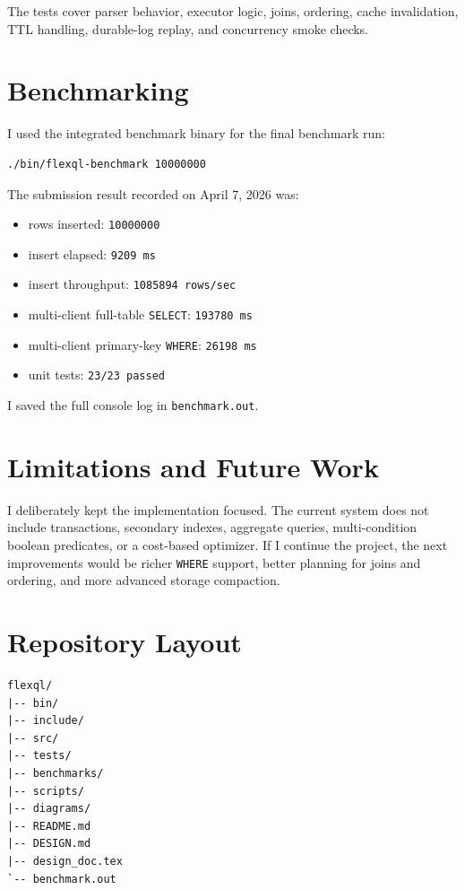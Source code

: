 \documentclass[11pt,a4paper]{article}
\begin{document}
The tests cover parser behavior, executor logic, joins, ordering, cache invalidation, TTL handling, durable-log replay, and concurrency smoke checks.

\section{Benchmarking}

I used the integrated benchmark binary for the final benchmark run:

\begin{verbatim}
./bin/flexql-benchmark 10000000
\end{verbatim}

The submission result recorded on April 7, 2026 was:

\begin{itemize}[leftmargin=1.5em]
    \item rows inserted: \texttt{10000000}
    \item insert elapsed: \texttt{9209 ms}
    \item insert throughput: \texttt{1085894 rows/sec}
    \item multi-client full-table \texttt{SELECT}: \texttt{193780 ms}
    \item multi-client primary-key \texttt{WHERE}: \texttt{26198 ms}
    \item unit tests: \texttt{23/23 passed}
\end{itemize}

I saved the full console log in \texttt{benchmark.out}.

\section{Limitations and Future Work}

I deliberately kept the implementation focused. The current system does not include transactions, secondary indexes, aggregate queries, multi-condition boolean predicates, or a cost-based optimizer. If I continue the project, the next improvements would be richer \texttt{WHERE} support, better planning for joins and ordering, and more advanced storage compaction.

\section{Repository Layout}

\begin{verbatim}
flexql/
|-- bin/
|-- include/
|-- src/
|-- tests/
|-- benchmarks/
|-- scripts/
|-- diagrams/
|-- README.md
|-- DESIGN.md
|-- design_doc.tex
`-- benchmark.out
\end{verbatim}
\end{document}
